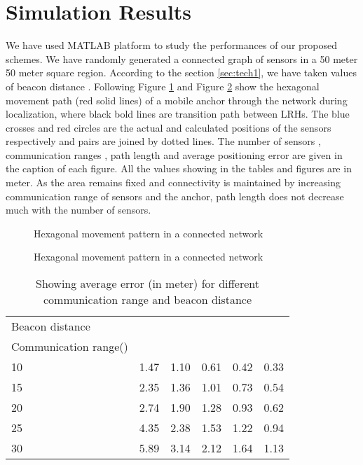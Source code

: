 \documentclass[preprint,11pt]{elsarticle}
\begin{document}
\section{Simulation Results}
\label{sec:sim}
We have used MATLAB platform to study the performances of our proposed schemes. We have randomly generated a connected graph of
sensors in a 50 meter  50 meter square region. According to the section \ref{sec:tech1}, we have taken values of beacon
distance . Following Figure \ref{f:fig11} and Figure \ref{f:fig12} show the hexagonal movement path (red solid lines)
of a mobile anchor through the network during localization, where black bold lines are transition path between LRHs.
The blue crosses and red circles are the actual and calculated positions of the sensors respectively and pairs are joined by dotted lines.
The number of sensors , communication ranges , path length  and average positioning error are given in the caption of each figure.
All the values showing in the tables and figures are in meter. As the area remains fixed and connectivity is maintained by increasing
communication range of sensors and the anchor, path length does not decrease much with the number of sensors.
\begin{figure}[h]
\centering
{}
\caption{Hexagonal movement pattern in a connected network}
\label{f:fig11}
\end{figure}
\begin{figure}[h]
\centering
{}
\caption{Hexagonal movement pattern in a connected network}
\label{f:fig12}
\end{figure}
\begin{table}[]
\centering
\caption{Showing average error (in meter) for different communication range and beacon distance \label{table:5}}
\begin{tabular}
{p{4.5cm}|p{1.2cm}|p{1.2cm}|p{1.2cm}|p{1.2cm}|p{1.2cm} }
\hline
\hline
Beacon distance   &  &  &  &  &  \\
Communication range()  &&&&&\\
\hline
10 &1.47  & 1.10 & 0.61 & 0.42 & 0.33  \\
15 &2.35  & 1.36 & 1.01 & 0.73 & 0.54 \\
20 &2.74  & 1.90 & 1.28 & 0.93 & 0.62 \\
25 &4.35  & 2.38 & 1.53 & 1.22 & 0.94 \\
30 &5.89  & 3.14 & 2.12 & 1.64 & 1.13 \\
\hline
\hline
\end{tabular}
\end{table}
\end{document}
